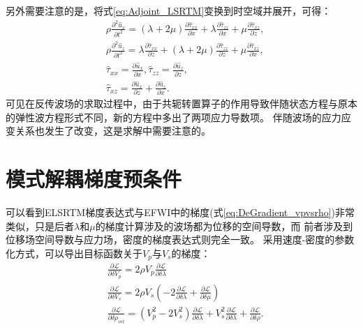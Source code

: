 另外需要注意的是，将式\eqref{eq:Adjoint_LSRTM}变换到时空域并展开，可得：
\begin{equation}
\begin{split}
	& \rho\frac{\partial^2 \hat{u}_{x}}{\partial t^2}=	(\lambda+2\mu)\frac{\partial \hat{\tau}_{xx}}{\partial x}+
		\lambda\frac{\partial \hat{\tau}_{zz}}{\partial x}+\mu\frac{\partial \hat{\tau}_{xz}}{\partial z},\\
		& \rho\frac{\partial^2 \hat{u}_{z}}{\partial t^2}=	\lambda\frac{\partial \hat{\tau}_{xx}}{\partial z}+
		(\lambda+2\mu)\frac{\partial \hat{\tau}_{zz}}{\partial z}+\mu\frac{\partial \hat{\tau}_{xz}}{\partial x},\\
		& \hat{\tau}_{xx}=\frac{\partial \hat{u}_x}{\partial x}, \hat{\tau}_{zz}=\frac{\partial \hat{u}_z}{\partial z},\\
		& \hat{\tau}_{xz}=\frac{\partial \hat{u}_x}{\partial z} + \frac{\partial \hat{u}_z}{\partial x}.
    \label{eq:Time_Adjoint_WE_LSRTM}
\end{split}
\end{equation}
可见在反传波场的求取过程中，由于共轭转置算子的作用导致伴随状态方程与原本的弹性波方程形式不同，新的方程中多出了两项应力导数项。
伴随波场的应力应变关系也发生了改变，这是求解中需要注意的。
\section{模式解耦梯度预条件}
可以看到ELSRTM梯度表达式与EFWI中的梯度(式\ref{eq:DeGradient_vpvsrho})非常类似，只是后者$\lambda$和$\mu$的梯度计算涉及的波场都为位移的空间导数，而
前者涉及到位移场空间导数与应力场，密度的梯度表达式则完全一致。
采用速度-密度的参数化方式，可以导出目标函数关于$V_p$与$V_s$的梯度：
\begin{equation}
\begin{split}
   & \frac{\partial\mathcal{L}}{\partial \delta V_p}=2\rho V_p\frac{\partial\mathcal{L}}{\partial \delta \lambda}\\
   & \frac{\partial\mathcal{L}}{\partial \delta V_s}=2\rho V_s(-2\frac{\partial\mathcal{L}}{\partial \delta \lambda}
	+\frac{\partial\mathcal{L}}{\partial \delta \mu})\\
   & \frac{\partial\mathcal{L}}{\partial \delta\rho_{vel}}=(V^2_p-2V^2_s)\frac{\partial\mathcal{L}}{\partial \delta \lambda}+V^2_s\frac{\partial\mathcal{L}}{\partial \delta \lambda}+\frac{\partial\mathcal{L}}{\partial \delta\rho}.
    \label{eq:Gradient_VpVsrho_LSRTM}
\end{split}
\end{equation}

